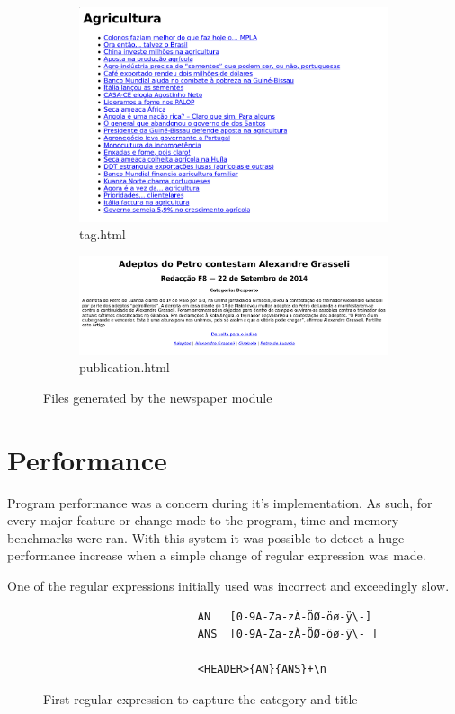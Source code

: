 \documentclass[a4paper]{report}
\begin{document}
\begin{figure}[H]
\begin{subfigure}{0.45\textwidth}
    \end{subfigure}
    \begin{subfigure}{0.45\textwidth}
        \includegraphics[width=\textwidth]{./tag_print.png}
        \caption{tag.html}
    \end{subfigure}
    \begin{subfigure}{0.54\textwidth}
        \includegraphics[width=\textwidth]{./publication_print.png}
        \caption{publication.html}
    \end{subfigure}
    \caption{Files generated by the newspaper module}
\end{figure}

\chapter{Performance}

Program performance was a concern during it's implementation. As such, for every
major feature or change made to the program, time and memory benchmarks were
ran. With this system it was possible to detect a huge performance increase
when a simple change of regular expression was made.

One of the regular expressions initially used was incorrect and exceedingly slow.
\begin{figure}[H]
    \centering
    \begin{verbatim}
                        AN   [0-9A-Za-zÀ-ÖØ-öø-ÿ\-]
                        ANS  [0-9A-Za-zÀ-ÖØ-öø-ÿ\- ]

                        <HEADER>{AN}{ANS}+\n
    \end{verbatim}
    \caption{First regular expression to capture the category and title}
\end{figure}
\end{document}
